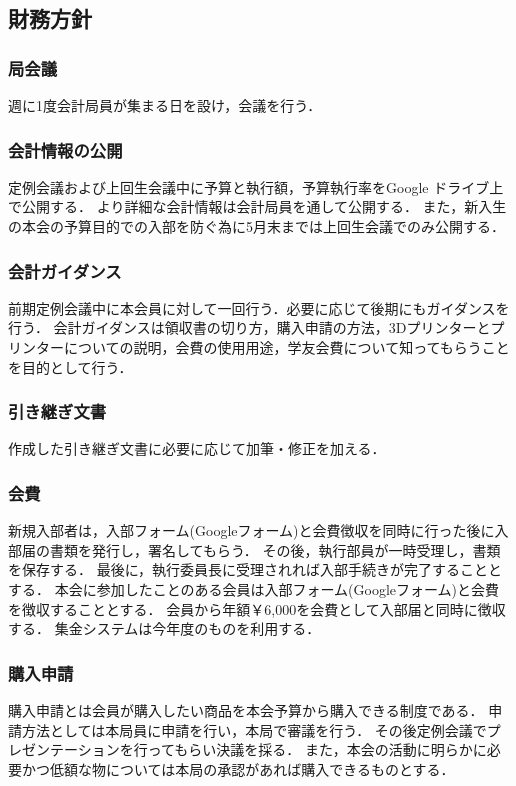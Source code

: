 \subsection*{財務方針}


\subsubsection*{局会議}
週に1度会計局員が集まる日を設け，会議を行う．

\subsubsection*{会計情報の公開}
定例会議および上回生会議中に予算と執行額，予算執行率をGoogle ドライブ上で公開する．
より詳細な会計情報は会計局員を通して公開する．
また，新入生の本会の予算目的での入部を防ぐ為に5月末までは上回生会議でのみ公開する．

\subsubsection*{会計ガイダンス}
前期定例会議中に本会員に対して一回行う．必要に応じて後期にもガイダンスを行う．
会計ガイダンスは領収書の切り方，購入申請の方法，3Dプリンターとプリンターについての説明，会費の使用用途，学友会費について知ってもらうことを目的として行う．

\subsubsection*{引き継ぎ文書}
作成した引き継ぎ文書に必要に応じて加筆・修正を加える．

\subsubsection*{会費}
新規入部者は，入部フォーム(Googleフォーム)と会費徴収を同時に行った後に入部届の書類を発行し，署名してもらう．
その後，執行部員が一時受理し，書類を保存する．
最後に，執行委員長に受理されれば入部手続きが完了することとする．
本会に参加したことのある会員は入部フォーム(Googleフォーム)と会費を徴収することとする．
会員から年額￥6,000を会費として入部届と同時に徴収する．
集金システムは今年度のものを利用する．

\subsubsection*{購入申請}
購入申請とは会員が購入したい商品を本会予算から購入できる制度である．
申請方法としては本局員に申請を行い，本局で審議を行う．
その後定例会議でプレゼンテーションを行ってもらい決議を採る．
また，本会の活動に明らかに必要かつ低額な物については本局の承認があれば購入できるものとする．

